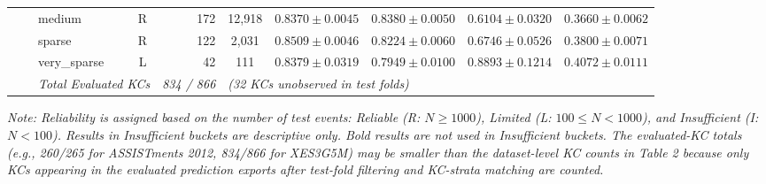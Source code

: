 \begin{tableorg}[htbp]
{\begin{tabular}{lllcrccccc}
 &  & medium & R & 172 & 12,918 & $0.8370 \pm 0.0045$ & $0.8380 \pm 0.0050$ & $0.6104 \pm 0.0320$ & $0.3660 \pm 0.0062$ \\
 &  & sparse & R & 122 & 2,031 & $0.8509 \pm 0.0046$ & $0.8224 \pm 0.0060$ & $0.6746 \pm 0.0526$ & $0.3800 \pm 0.0071$ \\
 &  & very\_sparse & L & 42 & 111 & $0.8379 \pm 0.0319$ & $0.7949 \pm 0.0100$ & $0.8893 \pm 0.1214$ & $0.4072 \pm 0.0111$ \\
\cmidrule{3-10}
 & & \multicolumn{2}{r}{\textit{Total Evaluated KCs}} & \textit{834 / 866} & \multicolumn{5}{l}{\textit{(32 KCs unobserved in test folds)}} \\
\bottomrule

\end{tabular}
}

\vspace{1ex}
\noindent\footnotesize \textit{Note: Reliability is assigned based on the number of test events: Reliable (R: $N \ge 1000$), Limited (L: $100 \le N < 1000$), and Insufficient (I: $N < 100$). Results in Insufficient buckets are descriptive only. Bold results are not used in Insufficient buckets. The evaluated-KC totals (e.g., 260/265 for ASSISTments 2012, 834/866 for XES3G5M) may be smaller than the dataset-level KC counts in Table 2 because only KCs appearing in the evaluated prediction exports after test-fold filtering and KC-strata matching are counted.}


\end{tableorg}
